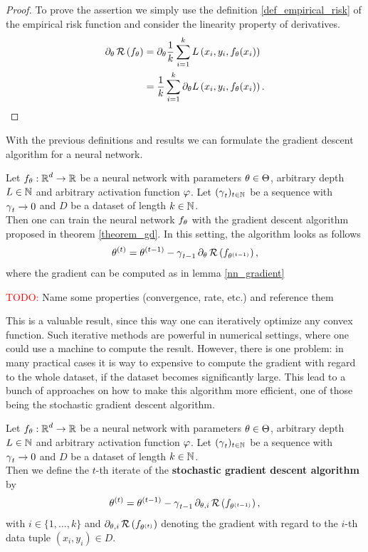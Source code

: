 \begin{proof}
To prove the assertion we simply use the definition \ref{def_empirical_risk} of the empirical risk function and consider the linearity property of derivatives.
\begin{align*}
\partial_\theta \operatorname{\mathcal{R}} \left(f_{\theta}\right) &= \partial_\theta \frac{1}{k} \sum_{i=1}^{k} L\left(x_i, y_i, f_\theta(x_i)\right)\\
&= \frac{1}{k} \sum_{i=1}^{k} \partial_\theta L\left(x_i, y_i, f_\theta(x_i)\right).
\end{align*}
\end{proof}


With the previous definitions and results we can formulate the gradient descent algorithm for a neural network.


\begin{corollary}
Let $f_\theta:\operatorname{\mathbb{R}}^d\to \operatorname{\mathbb{R}}$ be a neural network with parameters $\theta\in\operatorname{\Theta}$, arbitrary depth $L\in\operatorname{\mathbb{N}}$ and arbitrary activation function $\operatorname{\varphi}$. Let $(\operatorname{\gamma}_t)_{t \in \operatorname{\mathbb{N}}}$ be a sequence with $\operatorname{\gamma}_t \to 0$ and $D$ be a dataset of length $k\in \operatorname{\mathbb{N}}$.\\
Then one can train the neural network $f_\theta$ with the gradient descent algorithm proposed in theorem \ref{theorem_gd}. In this setting, the algorithm looks as follows
\begin{align*}
\theta^{(t)} = \theta^{(t - 1)} - \operatorname{\gamma}_{t-1} \partial_\theta \operatorname{\mathcal{R}} \left(f_{\theta^{(t -1)}}\right),
\end{align*}
where the gradient can be computed as in lemma \ref{nn_gradient}
\end{corollary}


\textcolor{red}{TODO:} Name some properties (convergence, rate, etc.) and reference them


This is a valuable result, since this way one can iteratively optimize any convex function. Such iterative methods are powerful in numerical settings, where one could use a machine to compute the result. However, there is one problem: in many practical cases it is way to expensive to compute the gradient with regard to the whole dataset, if the dataset becomes significantly large. This lead to a bunch of approaches on how to make this algorithm more efficient, one of those being the stochastic gradient descent algorithm.

\begin{theorem}\label{theorem:sgd}
Let $f_\theta:\operatorname{\mathbb{R}}^d\to \operatorname{\mathbb{R}}$ be a neural network with parameters $\theta\in\operatorname{\Theta}$, arbitrary depth $L\in\operatorname{\mathbb{N}}$ and arbitrary activation function $\operatorname{\varphi}$. Let $(\operatorname{\gamma}_t)_{t \in \operatorname{\mathbb{N}}}$ be a sequence with $\operatorname{\gamma}_t \to 0$ and $D$ be a dataset of length $k\in \operatorname{\mathbb{N}}$.\\
Then we define the $t$-th iterate of the \textbf{stochastic gradient descent algorithm} by
\begin{align}
\theta^{(t)} = \theta^{(t - 1)} - \operatorname{\gamma}_{t-1} \partial_{\theta, i} \operatorname{\mathcal{R}} \left(f_{\theta^{(t - 1)}}\right),
\end{align}
with $i \in \{1,\ldots, k\}$ and $\partial_{\theta, i} \operatorname{\mathcal{R}} \left(f_{\theta^{(t)}}\right)$ denoting the gradient with regard to the $i$-th data tuple $(x_i, y_i) \in D$.
\end{theorem}


